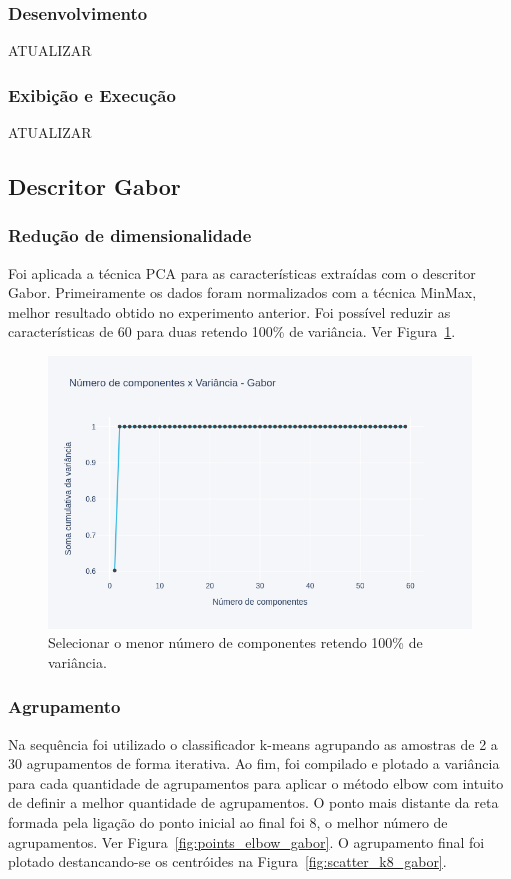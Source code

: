 \documentclass[a4paper, 12 pt, conference]{ieeeconf}  %
\begin{document}
\subsubsection{Desenvolvimento} ATUALIZAR
\subsubsection{Exibição e Execução} ATUALIZAR

\subsection{Descritor Gabor}
\subsubsection{Redução de dimensionalidade}
Foi aplicada a técnica PCA para as características extraídas com o descritor Gabor. Primeiramente os dados  foram normalizados com a técnica MinMax, melhor resultado obtido no experimento anterior. Foi possível reduzir as características de 60 para duas retendo 100\% de variância. Ver  Figura~\ref{fig:points_pca_gabor}.

\begin{figure}[!htbp]
	\centering
	\includegraphics[width=1.0\linewidth,clip=true,trim=0cm 0cm 0cm 0cm, keepaspectratio=true]{points_pca_gabor.png}
	\caption{Selecionar o menor número de componentes retendo 100\% de variância.}
	\label{fig:points_pca_gabor}
\end{figure}

\subsubsection{Agrupamento}
Na sequência foi utilizado o classificador k-means agrupando as amostras de 2 a 30 agrupamentos de forma iterativa. Ao fim, foi compilado e plotado a variância para cada quantidade de agrupamentos para aplicar o método elbow com intuito de definir a melhor quantidade de agrupamentos. O ponto mais distante da reta formada pela ligação do ponto inicial ao final foi 8, o melhor número de agrupamentos. Ver Figura~\ref{fig:points_elbow_gabor}. O agrupamento final foi plotado destancando-se os centróides na Figura~\ref{fig:scatter_k8_gabor}.
\end{document}
